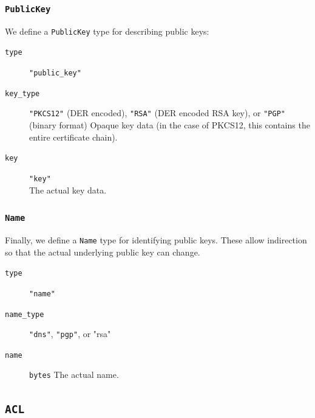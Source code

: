 \documentclass[pdftex,12pt,a4papaer,twoside,notitlepage]{report}
\begin{document}
\subsubsection{\texttt{PublicKey}}

We define a \texttt{PublicKey} type for describing public keys:

\begin{leftbar}
\begin{description}
\item[\texttt{type}] \verb="public_key"=
\item[\texttt{key\_type}] \verb="PKCS12"= (DER encoded), \verb="RSA"= (DER
  encoded RSA key), or \verb="PGP"= (binary format) Opaque key data (in the case
  of PKCS12, this contains the entire certificate chain).
\item[\texttt{key}] \verb="key"= \\
  The actual key data.
\end{description}
\end{leftbar}

\subsubsection{\texttt{Name}}

Finally, we define a \texttt{Name} type for identifying public keys. These allow
indirection so that the actual underlying public key can change.

\begin{leftbar}
\begin{description}
  \item[\texttt{type}] \verb="name"=
  \item[\texttt{name\_type}] \verb="dns"=, \verb="pgp"=, or "rsa"
  \item[\texttt{name}] \texttt{bytes}
    The actual name.
\end{description}
\end{leftbar}

\subsection{\texttt{ACL}}
\end{document}
